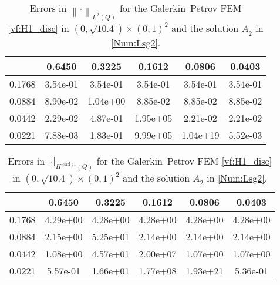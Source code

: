 \documentclass[a4paper,11pt]{article}
\newcommand{\cu}{\operatorname{curl}}
\renewcommand{\vec}[1]{\underline{#1}}
\newcommand{\abs}[1]{\left\lvert{#1}\right\rvert}
\newcommand{\norm}[1]{{\left\lVert{#1}\right\rVert}}
\begin{document}
\begin{table}
		\begin{center}
	\caption{Errors in $\norm{\cdot}_{L^2(Q)}$ for the Galerkin--Petrov FEM \eqref{vf:H1_disc} in $(0,\sqrt{10.4})\times(0,1)^2$ and the solution $\vec A_2$ in \eqref{Num:Lsg2}.}
	\begin{tabular}{c|ccccc}
		\diagbox{$h_x$}{\vspace*{-.1cm}$h_t$}&   0.6450 &  0.3225 &  0.1612 & 0.0806 & 0.0403 \\
			\hline\hline
		0.1768 & 3.54e-01 & 3.54e-01 & 3.54e-01 & 3.54e-01 & 3.54e-01 \\
		0.0884 & 8.90e-02 & 1.04e+00 & 8.85e-02 & 8.85e-02 & 8.85e-02 \\
		0.0442 & 2.29e-02 & 4.87e-01 & 1.95e+05 & 2.21e-02 & 2.21e-02 \\
		0.0221 & 7.88e-03 & 1.83e-01 & 9.99e+05 & 1.04e+19 & 5.52e-03 \\
	\end{tabular}
	\label{Num:TabL2}
\end{center}
\end{table}


\begin{table}
	\caption{Errors in $\abs{\cdot}_{H^{\cu;1}(Q)}$  for the Galerkin--Petrov FEM \eqref{vf:H1_disc} in $(0,\sqrt{10.4})\times(0,1)^2$ and the solution $\vec A_2$ in \eqref{Num:Lsg2}.}
	\begin{center}
	\begin{tabular}{c|ccccc}
		\diagbox{$h_x$}{\vspace*{-.1cm}$h_t$}&    0.6450 &  0.3225 &  0.1612 &  0.0806 &  0.0403 \\
			\hline\hline
		0.1768 & 4.29e+00 & 4.28e+00 & 4.28e+00 & 4.28e+00 & 4.28e+00 \\
		0.0884 & 2.15e+00 & 5.25e+01 & 2.14e+00 & 2.14e+00 & 2.14e+00 \\
		0.0442 & 1.08e+00 & 4.57e+01 & 2.00e+07 & 1.07e+00 & 1.07e+00 \\
		0.0221 & 5.57e-01 & 1.66e+01 & 1.77e+08 & 1.93e+21 & 5.36e-01 \\
	\end{tabular}
	\label{Num:TabHC1}
\end{center}
\end{table}
\end{document}
